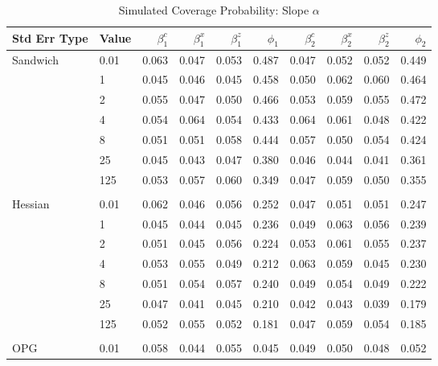 \documentclass[12pt]{article}
\theoremstyle{definition}
\begin{document}
\begin{table}[b!] \centering
  \caption{Simulated Coverage Probability: Slope $\alpha$}
  \begin{threeparttable}
    {\footnotesize
    \begin{tabular}[r]{l l r r r r r r r r}
  \hline
Std Err Type & Value & $\beta_{1}^{c}$ & $\beta_{1}^{x}$ & $\beta_{1}^{z}$ & $\phi_{1}$ & $\beta_{2}^{c}$ & $\beta_{2}^{x}$ & $\beta_{2}^{z}$ & $\phi_{2}$ \\ 
  \hline

Sandwich  & 0.01 & 0.063 & 0.047 & 0.053 & 0.487 & 0.047 & 0.052 & 0.052 & 0.449 \\
          &    1 & 0.045 & 0.046 & 0.045 & 0.458 & 0.050 & 0.062 & 0.060 & 0.464 \\
          &    2 & 0.055 & 0.047 & 0.050 & 0.466 & 0.053 & 0.059 & 0.055 & 0.472 \\
          &    4 & 0.054 & 0.064 & 0.054 & 0.433 & 0.064 & 0.061 & 0.048 & 0.422 \\
          &    8 & 0.051 & 0.051 & 0.058 & 0.444 & 0.057 & 0.050 & 0.054 & 0.424 \\
          &   25 & 0.045 & 0.043 & 0.047 & 0.380 & 0.046 & 0.044 & 0.041 & 0.361 \\
          &  125 & 0.053 & 0.057 & 0.060 & 0.349 & 0.047 & 0.059 & 0.050 & 0.355 \\
          &      &       &       &       &       &       &       &       &       \\
Hessian   & 0.01 & 0.062 & 0.046 & 0.056 & 0.252 & 0.047 & 0.051 & 0.051 & 0.247 \\
          &    1 & 0.045 & 0.044 & 0.045 & 0.236 & 0.049 & 0.063 & 0.056 & 0.239 \\
          &    2 & 0.051 & 0.045 & 0.056 & 0.224 & 0.053 & 0.061 & 0.055 & 0.237 \\
          &    4 & 0.053 & 0.055 & 0.049 & 0.212 & 0.063 & 0.059 & 0.045 & 0.230 \\
          &    8 & 0.051 & 0.054 & 0.057 & 0.240 & 0.049 & 0.054 & 0.049 & 0.222 \\
          &   25 & 0.047 & 0.041 & 0.045 & 0.210 & 0.042 & 0.043 & 0.039 & 0.179 \\
          &  125 & 0.052 & 0.055 & 0.052 & 0.181 & 0.047 & 0.059 & 0.054 & 0.185 \\
          &      &       &       &       &       &       &       &       &       \\
OPG       & 0.01 & 0.058 & 0.044 & 0.055 & 0.045 & 0.049 & 0.050 & 0.048 & 0.052 \\

\end{tabular}}
\end{threeparttable}
\end{table}
\end{document}
